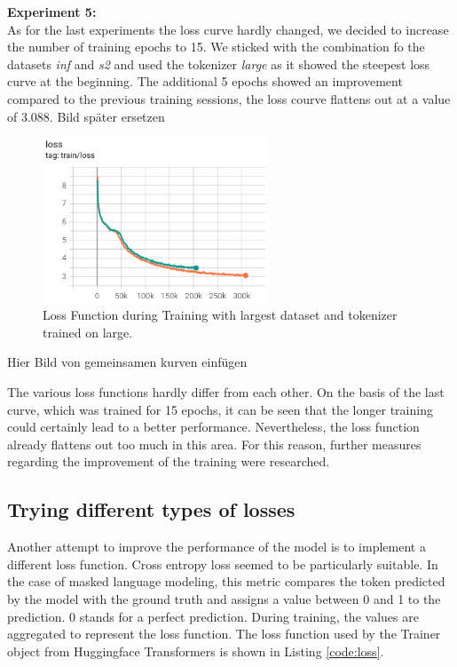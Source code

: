 \textbf{Experiment 5:}\\
As for the last experiments the loss curve hardly changed, we decided to increase the number of training epochs to 15. We sticked with the combination fo the datasets \textit{inf} and \textit{s2} and used the tokenizer \textit{large} as it showed the steepest loss curve at the beginning. The additional 5 epochs showed an improvement compared to the previous training sessions, the loss courve flattens out at a value of 3.088.
\alert{Bild später ersetzen}
\begin{figure}[H]
	\centering
	\includegraphics[width=0.6\textwidth]{figures/loss_infs2_large.png}
	\caption{Loss Function during Training with largest dataset and tokenizer trained on large.}
	\label{fig:loss_large_large}
\end{figure}

\alert{Hier Bild von gemeinsamen kurven einfügen}

The various loss functions hardly differ from each other. On the basis of the last curve, which was trained for 15 epochs, it can be seen that the longer training could certainly lead to a better performance. Nevertheless, the loss function already flattens out too much in this area. For this reason, further \alert{ measures} regarding the improvement of the training were researched.

\subsection{Trying different types of losses}
Another attempt to improve the performance of the model is to implement a different loss function. Cross entropy loss seemed to be particularly suitable. In the case of masked language modeling, this metric compares the token predicted by the model with the ground truth and assigns a value between 0 and 1 to the prediction. 0 stands for a perfect prediction. During training, the values are aggregated to represent the loss function. \newline
The loss function used by the \alert{Trainer object from Huggingface Transformers} is shown in Listing \ref{code:loss}.

